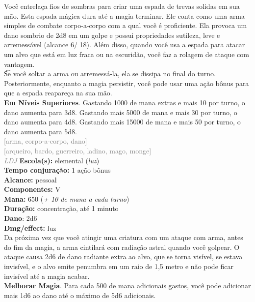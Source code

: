 \documentclass{RPG_Adventure}[2021/10/20]
\begin{document}
{\normalsize Você entrelaça fios de sombras para criar uma espada de trevas solidas em sua mão. Esta espada mágica dura até a magia terminar. Ele conta como uma arma simples de combate corpo-a-corpo com a qual você é proficiente. Ela provoca um dano sombrio de 2d8 em um golpe e possui propriedades sutileza, leve e arremessável (alcance 6/ 18). Além disso, quando você usa a espada para atacar um alvo que está em luz fraca ou na escuridão, você faz a rolagem de ataque com vantagem.\\\t Se você soltar a arma ou arremessá-la, ela se dissipa no final do turno. Posteriormente, enquanto a magia persistir, você pode usar uma ação bônus para que a espada reapareça na sua mão.\\\t \textbf{Em Níveis Superiores}. Gastando 1000 de mana extras e mais 10 por turno, o dano aumenta para 3d8. Gastando mais 5000 de mana e mais 30 por turno, o dano aumenta para 4d8. Gastando mais 15000 de mana e mais 50 por turno, o dano aumenta para 5d8.\\}
{\scriptsize \textcolor{gray}{[arma, corpo-a-corpo, dano]\\}}
{\scriptsize \textcolor{gray}{[arqueiro, bardo, guerreiro, ladino, mago, monge]\\}}
{\tiny \textcolor{gray}{\textit{LDJ}}}
{\small \t \textbf{Escola(s):} elemental (\textit{luz})\\\t \textbf{Tempo conjuração:} 1 ação bônus\\\t \textbf{Alcance:} pessoal\\\t \textbf{Componentes:} V\\\t \textbf{Mana:} 650 (\textit{+ 10 de mana a cada turno})\\\t \textbf{Duração:} concentração, até 1 minuto\\\t \textbf{Dano}: 2d6\\\t \textbf{Dmg/effect:} luz\\}
{\normalsize Da próxima vez que você atingir uma criatura com um ataque com arma, antes do fim da magia, a arma cintilará com radiação astral quando você golpear. O ataque causa 2d6 de dano radiante extra ao alvo, que se torna visível, se estava invisível, e o alvo emite penumbra em um raio de 1,5 metro e não pode ficar invisível até a magia acabar.\\\t \textbf{Melhorar Magia}. Para cada 500 de mana adicionais gastos, você pode adicionar mais 1d6 ao dano até o máximo de 5d6 adicionais.\\}
\end{document}
